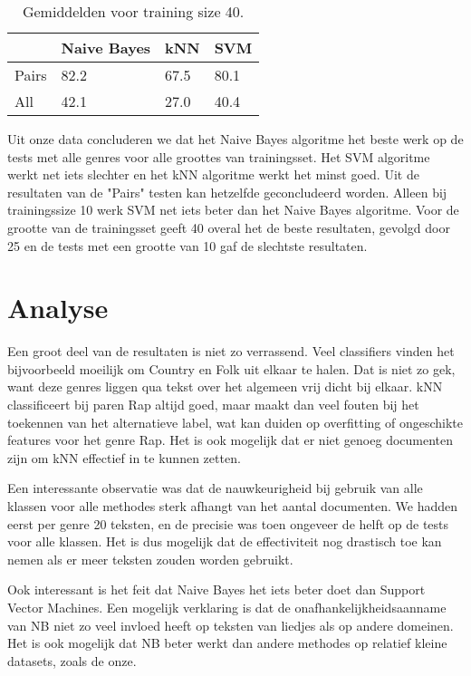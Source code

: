 \documentclass[a4paper,oneside]{article}
\begin{document}
\begin{table}[H]\centering
\caption{Gemiddelden voor training size 40.}
\begin{tabu}{l|l|l|l}
& Naive Bayes & kNN & SVM \\ \hline
Pairs & 82.2 & 67.5 & 80.1 \\
All & 42.1 & 27.0 & 40.4 \\
\end{tabu}
\end{table}

Uit onze data concluderen we dat het Naive Bayes algoritme het beste werk op de tests met alle genres voor alle groottes van trainingsset. Het SVM algoritme werkt net iets slechter en het kNN algoritme werkt het minst goed. Uit de resultaten van de "Pairs" testen kan hetzelfde geconcludeerd worden. Alleen bij trainingssize 10 werk SVM net iets beter dan het Naive Bayes algoritme. Voor de grootte van de trainingsset geeft 40 overal het de beste  resultaten, gevolgd door 25 en de tests met een grootte van 10 gaf de slechtste resultaten. 

\section{Analyse}
Een groot deel van de resultaten is niet zo verrassend. Veel classifiers vinden het bijvoorbeeld moeilijk om Country en Folk uit elkaar te halen. Dat is niet zo gek, want deze genres liggen qua tekst over het algemeen vrij dicht bij elkaar. kNN classificeert bij paren Rap altijd goed, maar maakt dan veel fouten bij het toekennen van het alternatieve label, wat kan duiden op overfitting of ongeschikte features voor het genre Rap. Het is ook mogelijk dat er niet genoeg documenten zijn om kNN effectief in te kunnen zetten.

Een interessante observatie was dat de nauwkeurigheid bij gebruik van alle klassen voor alle methodes sterk afhangt van het aantal documenten. We hadden eerst per genre 20 teksten, en de precisie was toen ongeveer de helft op de tests voor alle klassen. Het is dus mogelijk dat de effectiviteit nog drastisch toe kan nemen als er meer teksten zouden worden gebruikt.

Ook interessant is het feit dat Naive Bayes het iets beter doet dan Support Vector Machines. Een mogelijk verklaring is dat de onafhankelijkheidsaanname van NB niet zo veel invloed heeft op teksten van liedjes als op andere domeinen. Het is ook mogelijk dat NB beter werkt dan andere methodes op relatief kleine datasets, zoals de onze.
\end{document}
